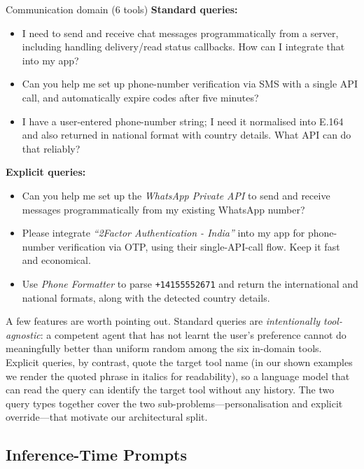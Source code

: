 \begin{examplebox}{Communication domain (6 tools)}
\textbf{Standard queries:}
\begin{itemize}\setlength{\itemsep}{1pt}
    \item I need to send and receive chat messages programmatically
    from a server, including handling delivery/read status callbacks.
    How can I integrate that into my app?
    \item Can you help me set up phone-number verification via SMS with
    a single API call, and automatically expire codes after five
    minutes?
    \item I have a user-entered phone-number string; I need it
    normalised into E.164 and also returned in national format with
    country details. What API can do that reliably?
\end{itemize}

\smallskip
\textbf{Explicit queries:}
\begin{itemize}\setlength{\itemsep}{1pt}
    \item Can you help me set up the \emph{WhatsApp Private API} to send
    and receive messages programmatically from my existing WhatsApp
    number?
    \item Please integrate \emph{``2Factor Authentication - India''}
    into my app for phone-number verification via OTP, using their
    single-API-call flow. Keep it fast and economical.
    \item Use \emph{Phone Formatter} to parse \texttt{+14155552671} and
    return the international and national formats, along with the
    detected country details.
\end{itemize}
\end{examplebox}

A few features are worth pointing out. Standard queries are
\emph{intentionally tool-agnostic}: a competent agent that has not
learnt the user's preference cannot do meaningfully better than uniform
random among the six in-domain tools. Explicit queries, by contrast,
quote the target tool name (in our shown examples we render the quoted
phrase in italics for readability), so a language model that can read
the query can identify the target tool without any history. The two
query types together cover the two sub-problems---personalisation and
explicit override---that motivate our architectural split.


\subsection{Inference-Time Prompts}
\label{app:prompts:inference}

